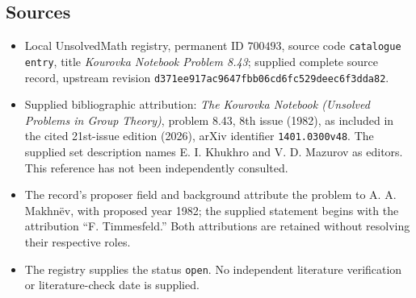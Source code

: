 \documentclass[11pt]{article}
\begin{document}
\subsection{Sources}
\begin{itemize}
\item Local UnsolvedMath registry, permanent ID \(700493\), source code \texttt{catalogue entry}, title \emph{Kourovka Notebook Problem 8.43}; supplied complete source record, upstream revision \texttt{d371ee917ac9647fbb06cd6fc529deec6f3dda82}.
\item Supplied bibliographic attribution: \emph{The Kourovka Notebook (Unsolved Problems in Group Theory)}, problem 8.43, 8th issue (1982), as included in the cited 21st-issue edition (2026), arXiv identifier \texttt{1401.0300v48}. The supplied set description names E. I. Khukhro and V. D. Mazurov as editors. This reference has not been independently consulted.
\item The record's proposer field and background attribute the problem to A. A. Makhn\"ev, with proposed year 1982; the supplied statement begins with the attribution ``F. Timmesfeld.'' Both attributions are retained without resolving their respective roles.
\item The registry supplies the status \texttt{open}. No independent literature verification or literature-check date is supplied.
\end{itemize}
\end{document}
